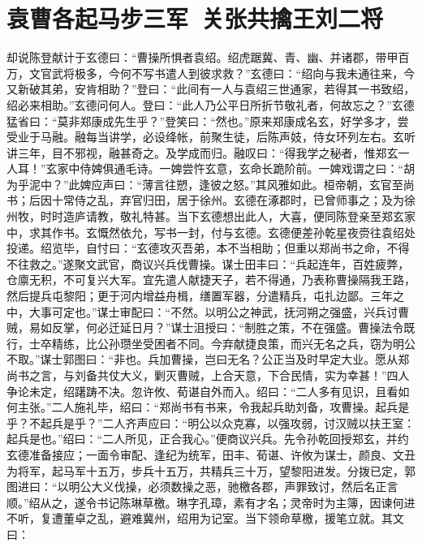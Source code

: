 \chapter{袁曹各起马步三军~关张共擒王刘二将}

却说陈登献计于玄德曰：“曹操所惧者袁绍。绍虎踞冀、青、幽、并诸郡，带甲百万，文官武将极多，今何不写书遣人到彼求救？”玄德曰：“绍向与我未通往来，今又新破其弟，安肯相助？”登曰：“此间有一人与袁绍三世通家，若得其一书致绍，绍必来相助。”玄德问何人。登曰：“此人乃公平日所折节敬礼者，何故忘之？”玄德猛省曰：“莫非郑康成先生乎？”登笑曰：“然也。”原来郑康成名玄，好学多才，尝受业于马融。融每当讲学，必设绛帐，前聚生徒，后陈声妓，侍女环列左右。玄听讲三年，目不邪视，融甚奇之。及学成而归。融叹曰：“得我学之秘者，惟郑玄一人耳！”玄家中侍婢俱通毛诗。一婢尝忤玄意，玄命长跪阶前。一婢戏谓之曰：“胡为乎泥中？”此婢应声曰：“薄言往愬，逢彼之怒。”其风雅如此。桓帝朝，玄官至尚书；后因十常侍之乱，弃官归田，居于徐州。玄德在涿郡时，已曾师事之；及为徐州牧，时时造庐请教，敬礼特甚。当下玄德想出此人，大喜，便同陈登亲至郑玄家中，求其作书。玄慨然依允，写书一封，付与玄德。玄德便差孙乾星夜赍往袁绍处投递。绍览毕，自忖曰：“玄德攻灭吾弟，本不当相助；但重以郑尚书之命，不得不往救之。”遂聚文武官，商议兴兵伐曹操。谋士田丰曰：“兵起连年，百姓疲弊，仓廪无积，不可复兴大军。宜先遣人献捷天子，若不得通，乃表称曹操隔我王路，然后提兵屯黎阳；更于河内增益舟楫，缮置军器，分遣精兵，屯扎边鄙。三年之中，大事可定也。”谋士审配曰：“不然。以明公之神武，抚河朔之强盛，兴兵讨曹贼，易如反掌，何必迁延日月？”谋士沮授曰：“制胜之策，不在强盛。曹操法令既行，士卒精练，比公孙瓒坐受困者不同。今弃献捷良策，而兴无名之兵，窃为明公不取。”谋士郭图曰：“非也。兵加曹操，岂曰无名？公正当及时早定大业。愿从郑尚书之言，与刘备共仗大义，剿灭曹贼，上合天意，下合民情，实为幸甚！”四人争论未定，绍躇踌不决。忽许攸、荀谌自外而入。绍曰：“二人多有见识，且看如何主张。”二人施礼毕，绍曰：“郑尚书有书来，令我起兵助刘备，攻曹操。起兵是乎？不起兵是乎？”二人齐声应曰：“明公以众克寡，以强攻弱，讨汉贼以扶王室：起兵是也。”绍曰：“二人所见，正合我心。”便商议兴兵。先令孙乾回授郑玄，并约玄德准备接应；一面令审配、逢纪为统军，田丰、荀谌、许攸为谋士，颜良、文丑为将军，起马军十五万，步兵十五万，共精兵三十万，望黎阳进发。分拨已定，郭图进曰：“以明公大义伐操，必须数操之恶，驰檄各郡，声罪致讨，然后名正言顺。”绍从之，遂令书记陈琳草檄。琳字孔璋，素有才名；灵帝时为主簿，因谏何进不听，复遭董卓之乱，避难冀州，绍用为记室。当下领命草檄，援笔立就。其文曰：


